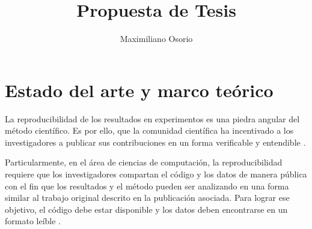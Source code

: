 \documentclass{llncs}
\begin{document}
%

\title{Propuesta de Tesis}
\author{Maximiliano Osorio}


\def\baselinestretch{0.97}
\maketitle

   

\section{Estado del arte y marco teórico}
\label{sec-intro}

La reproducibilidad de los resultados en experimentos es una piedra angular del método científico. Es por ello, que la comunidad científica ha incentivado a los investigadores a publicar sus contribuciones en un forma verificable y entendible \cite{james2014standing,stodden2010reproducible}.

Particularmente, en el área de ciencias de computación, la reproducibilidad requiere que los investigadores compartan el código y los datos de manera pública con el fin que los resultados y el método pueden ser analizando en una forma similar al trabajo original descrito en la publicación asociada.
Para lograr ese objetivo, el código debe estar disponible y los datos deben encontrarse en un formato leíble \cite{stodden2014implementing}.
\end{document}
